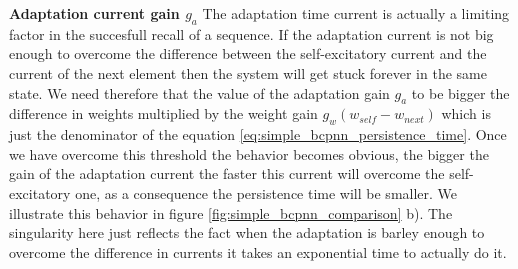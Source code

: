 \documentclass[10pt,a4paper]{article}
\begin{document}
\textbf{Adaptation current gain $g_a$}
The adaptation time current is actually a limiting factor in the succesfull recall of a sequence. If the adaptation current is not big enough to overcome the difference between the self-excitatory current and the current of the next element then the system will get stuck forever in the same state.  We need therefore that the value of the adaptation gain $g_a$ to be bigger the difference in weights multiplied by the weight gain $ g_w (w_{self}  - w_{next})$ which is just the denominator of the equation \ref{eq:simple_bcpnn_persistence_time}. Once we have overcome this threshold the behavior becomes obvious, the bigger the gain of the adaptation current the faster this current will overcome the self-excitatory one, as a consequence the persistence time will be smaller. We illustrate this behavior in figure \ref{fig:simple_bcpnn_comparison} b). The singularity here just reflects the fact when the adaptation is barley enough to overcome the difference in currents it takes an exponential time to actually do it. 
\end{document}
